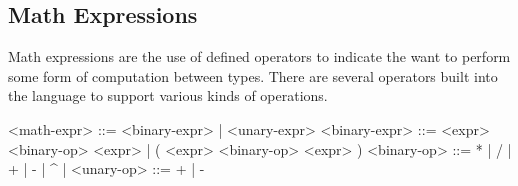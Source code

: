\subsection{Math Expressions}

Math expressions are the use of defined operators to indicate the want to perform some form of computation between types. There are several operators built into the language to support various kinds of operations.


\begin{grammar}
	<math-expr> ::= <binary-expr> | <unary-expr>
	<binary-expr> ::= <expr> <binary-op> <expr> | ( <expr> <binary-op> <expr> )
	<binary-op> ::= * | / | + | - | ^ | %
	<unary-op> ::= + | -
\end{grammar}
